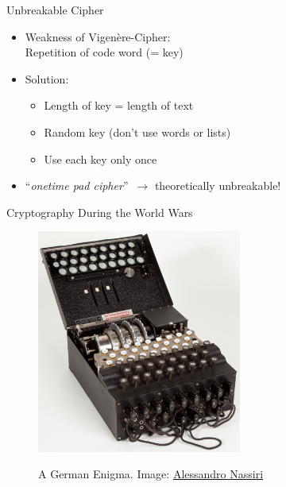 \documentclass[]{beamer}
\begin{document}
\begin{frame}{Unbreakable Cipher}
	\begin{itemize}
		\item<1-> Weakness of Vigenère-Cipher:\\ Repetition of code word (= key)
		\item<2-> Solution: 
		\begin{itemize}
			\item<2-> Length of key = length of text
			\item<3-> Random key (don't use words or lists)
			\item<4-> Use each key only once
		\end{itemize}
		\item<5-> ``\textit{onetime pad cipher}''\ \(\rightarrow\) theoretically unbreakable!
	\end{itemize}
\end{frame}

\begin{frame}{Cryptography During the World Wars}
	\begin{figure}
		\centering
		\includegraphics[width = 0.6\textwidth]{../assets/images/image_enigma}
		\label{fig:Enigma}
		\caption{A German Enigma. Image: \href{https://de.wikipedia.org/wiki/Datei:Enigma_(crittografia)_-_Museo_scienza_e_tecnologia_Milano.jpg}{Alessandro Nassiri}}
	\end{figure}
\end{frame}
\end{document}
